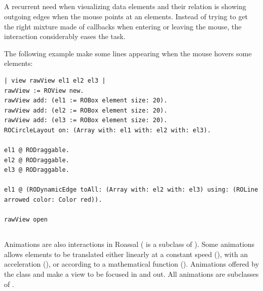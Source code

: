 \documentclass[a4paper,10pt,twoside]{book}
\begin{document}
%
%

\subsection*{} A recurrent need when visualizing data elements and their relation is showing outgoing edges when the mouse points at an elements. Instead of trying to get the right mixture made of callbacks when entering or leaving the mouse, the interaction  considerably eases the task.

The following example make some lines appearing when the mouse hovers some elements:

\begin{lstlisting}
| view rawView el1 el2 el3 |
rawView := ROView new.
rawView add: (el1 := ROBox element size: 20).
rawView add: (el2 := ROBox element size: 20).
rawView add: (el3 := ROBox element size: 20).
ROCircleLayout on: (Array with: el1 with: el2 with: el3).
	
el1 @ RODraggable.
el2 @ RODraggable.
el3 @ RODraggable.
	
el1 @ (RODynamicEdge toAll: (Array with: el2 with: el3) using: (ROLine arrowed color: Color red)).

rawView open
\end{lstlisting}

\subsection*{}
Animations are also interactions in Roassal (\ie {} is a subclass of ). Some animations allows elements to be translated either linearly at a constant speed (), with an acceleration (), or according to a mathematical function (). Animations offered by the class  and  make a view to be focused in and out. All animations are subclasses of .
\end{document}
